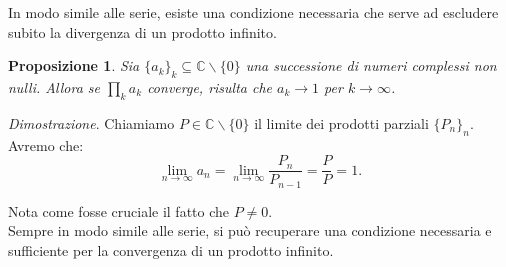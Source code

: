 \documentclass[11pt]{book}
\makeatletter
\theoremstyle{Definizione}
\theoremstyle{TeoremaProposizioneLemmaCorollarioCongettura}
\newtheorem{mypropo}[myteo]{Proposizione}
\theoremstyle{OsservazioneNotaEsempio}
\renewenvironment{proof}[1][\proofname]{\par
  \normalfont \topsep6\p@\@plus6\p@\relax
  \trivlist
  \item[\hskip\labelsep
        \itshape
    #1\@addpunct{.}]\ignorespaces
}{%
  \endtrivlist\@endpefalse
}
\renewenvironment{proof}{\textsl{Dimostrazione}.}{}
\newcommand{\C}{\mathbb{C}}
\newcommand{\tolto}{\smallsetminus}
\makeatother
\begin{document}
In modo simile alle serie, esiste una condizione necessaria che serve ad escludere subito la divergenza di un prodotto infinito.
\begin{boxpro}
\begin{mypropo}
Sia $\{a_k\}_k \subseteq \C \tolto \{0\}$ una successione di numeri complessi non nulli. Allora se $\prod_k a_k$ converge, risulta che $a_k \to 1$ per $k\to \infty$.
\end{mypropo}
\tcblower
\begin{proof}
Chiamiamo $P\in \C\tolto \{0\}$ il limite dei prodotti parziali $\{P_n\}_n$. Avremo che:
$$
\lim_{n \to \infty} a_n = \lim_{n \to \infty} \frac{P_{n}}{P_{n-1}} = \frac{P}{P} = 1.
$$
\end{proof}
\end{boxpro}
\noindent
Nota come fosse cruciale il fatto che $P\neq 0$.\\
\indent
Sempre in modo simile alle serie, si può recuperare una condizione necessaria e sufficiente per la convergenza di un prodotto infinito.
\end{document}
